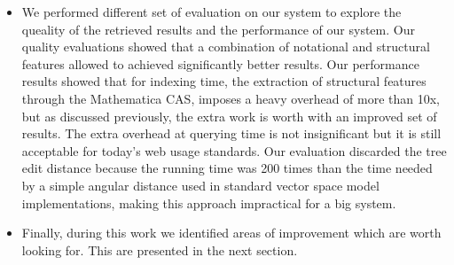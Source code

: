 \begin{itemize}
\item We performed different set of evaluation on our system to explore the queality of the retrieved results and the performance of our system. Our quality evaluations showed that a combination of notational and structural features allowed to achieved significantly better results. Our performance results showed that for indexing time, the extraction of structural features through the Mathematica CAS, imposes a heavy overhead of more than 10x, but as discussed previously, the extra work is worth with an improved set of results. The extra overhead at querying time is not insignificant but it is still acceptable for today's web usage standards. Our evaluation discarded the tree edit distance because the running time was 200 times than the time needed by a simple angular distance used in standard vector space model implementations, making this approach impractical for a big system.
\item Finally, during this work we identified areas of improvement which are worth looking for. This are presented in the next section.
\end{itemize}

